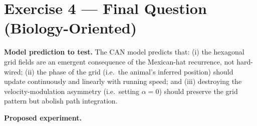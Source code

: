 \documentclass[11pt, a4paper]{article}
\begin{document}
\section{Exercise 4 --- Final Question (Biology-Oriented)}

\textbf{Model prediction to test.}
The CAN model predicts that: (i) the hexagonal grid fields are an emergent consequence of
the Mexican-hat recurrence, not hard-wired; (ii) the phase of the grid (i.e.\ the animal's
inferred position) should update continuously and linearly with running speed; and (iii)
destroying the velocity-modulation asymmetry (i.e.\ setting $\alpha = 0$) should preserve
the grid pattern but abolish path integration.

\textbf{Proposed experiment.}
\end{document}
